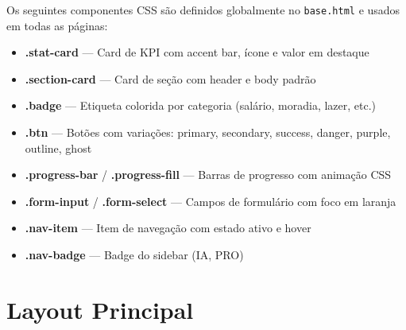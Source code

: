 \documentclass[12pt, a4paper, oneside]{report}
\begin{document}
Os seguintes componentes CSS são definidos globalmente no \texttt{base.html} e usados em todas as páginas:

\begin{itemize}
  \item \textbf{.stat-card} — Card de KPI com accent bar, ícone e valor em destaque
  \item \textbf{.section-card} — Card de seção com header e body padrão
  \item \textbf{.badge} — Etiqueta colorida por categoria (salário, moradia, lazer, etc.)
  \item \textbf{.btn} — Botões com variações: primary, secondary, success, danger, purple, outline, ghost
  \item \textbf{.progress-bar} / \textbf{.progress-fill} — Barras de progresso com animação CSS
  \item \textbf{.form-input} / \textbf{.form-select} — Campos de formulário com foco em laranja
  \item \textbf{.nav-item} — Item de navegação com estado ativo e hover
  \item \textbf{.nav-badge} — Badge do sidebar (IA, PRO)
\end{itemize}

\section{Layout Principal}
\end{document}
